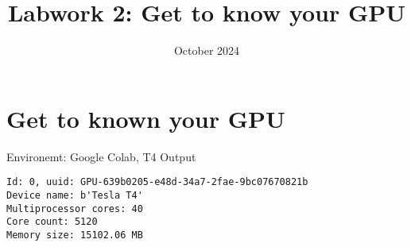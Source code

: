 \documentclass{article}
\begin{document}
\title{Labwork 2: Get to know your GPU}
\date{October 2024}
\section{Get to known your GPU}
Environemt: Google Colab, T4
\newline
Output
\begin{verbatim}
Id: 0, uuid: GPU-639b0205-e48d-34a7-2fae-9bc07670821b
Device name: b'Tesla T4'
Multiprocessor cores: 40
Core count: 5120
Memory size: 15102.06 MB
\end{verbatim}
\end{document}

